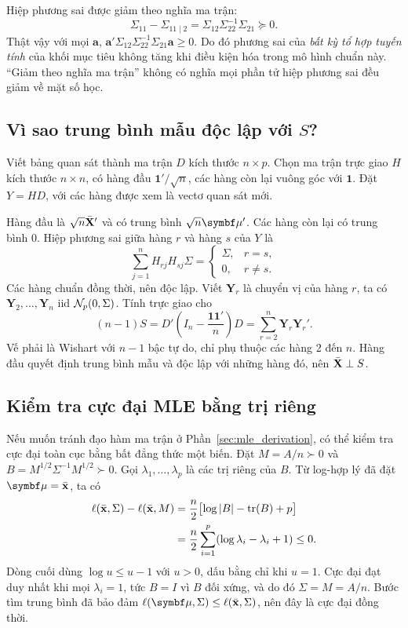 Hiệp phương sai được giảm theo nghĩa ma trận:
\[
 \Sigma_{11}-\Sigma_{11\mid2}
 =\Sigma_{12}\Sigma_{22}^{-1}\Sigma_{21}\succeq0.
\]
Thật vậy với mọi $\mathbf a$,
$\mathbf a'\Sigma_{12}\Sigma_{22}^{-1}\Sigma_{21}\mathbf a\ge0$.
Do đó phương sai của \emph{bất kỳ tổ hợp tuyến tính} của khối mục tiêu
không tăng khi điều kiện hóa trong mô hình chuẩn này. ``Giảm theo nghĩa
ma trận'' không có nghĩa mọi phần tử hiệp phương sai đều giảm về mặt số học.

\subsection{Vì sao trung bình mẫu độc lập với \texorpdfstring{$S$}{S}?}
\label{app:wishart}
Viết bảng quan sát thành ma trận $D$ kích thước $n\times p$.
Chọn ma trận trực giao $H$ kích thước $n\times n$, có hàng đầu
$\mathbf 1'/\sqrt n$, các hàng còn lại vuông góc với $\mathbf1$.
Đặt $Y=HD$, với các hàng được xem là vectơ quan sát mới.

Hàng đầu là $\sqrt n\bar{\mathbf X}'$ và có trung bình $\sqrt n\vmu'$.
Các hàng còn lại có trung bình 0. Hiệp phương sai giữa hàng $r$ và hàng
$s$ của $Y$ là
\[
 \sum_{j=1}^n H_{rj}H_{sj}\Sigma
 =\begin{cases}\Sigma,&r=s,\\0,&r\ne s.\end{cases}
\]
Các hàng chuẩn đồng thời, nên độc lập. Viết $\mathbf Y_r$ là chuyển vị
của hàng $r$, ta có $\mathbf Y_2,\ldots,\mathbf Y_n$ iid $\mathcal N_p(0,\Sigma)$.
Tính trực giao cho
\[
 (n-1)S=D'\left(I_n-\frac{\mathbf1\mathbf1'}n\right)D
 =\sum_{r=2}^n\mathbf Y_r\mathbf Y_r'.
\]
Vế phải là Wishart với $n-1$ bậc tự do, chỉ phụ thuộc các hàng 2 đến $n$.
Hàng đầu quyết định trung bình mẫu và độc lập với những hàng đó, nên
$\bar{\mathbf X}\perp S$.

\subsection{Kiểm tra cực đại MLE bằng trị riêng}
\label{app:mle_global}
Nếu muốn tránh đạo hàm ma trận ở Phần~\ref{sec:mle_derivation}, có thể
kiểm tra cực đại toàn cục bằng bất đẳng thức một biến.
Đặt $M=A/n\succ0$ và $B=M^{1/2}\Sigma^{-1}M^{1/2}\succ0$.
Gọi $\lambda_1,\ldots,\lambda_p$ là các trị riêng của $B$.
Từ log-hợp lý đã đặt $\vmu=\xbar$, ta có
\begin{align*}
 \ell(\bar{\mathbf x},\Sigma)-\ell(\bar{\mathbf x},M)
 &=\frac n2\bigl[\log|B|-\operatorname{tr}(B)+p\bigr]\\
 &=\frac n2\sum_{i=1}^p(\log\lambda_i-\lambda_i+1)\le0.
\end{align*}
Dòng cuối dùng $\log u\le u-1$ với $u>0$, dấu bằng chỉ khi $u=1$.
Cực đại đạt duy nhất khi mọi $\lambda_i=1$, tức $B=I$ vì $B$ đối xứng,
và do đó $\Sigma=M=A/n$. Bước tìm trung bình đã bảo đảm
$\ell(\vmu,\Sigma)\le\ell(\xbar,\Sigma)$, nên đây là cực đại đồng thời.

